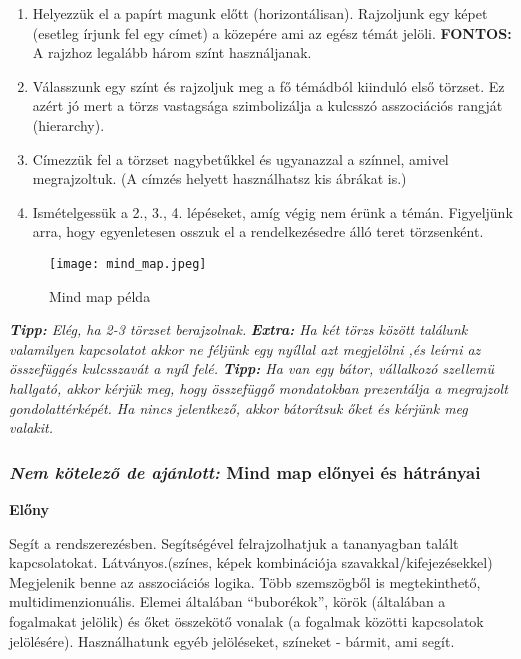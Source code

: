 \documentclass[../Main.tex]{subfiles}
\begin{document}
\begin{enumerate}
    \item Helyezzük el a papírt magunk előtt (horizontálisan).
    Rajzoljunk egy képet (esetleg írjunk fel egy címet) a közepére ami az egész témát jelöli.
    \textbf{FONTOS:} A rajzhoz legalább három színt használjanak.
    
    
    \item Válasszunk egy színt és rajzoljuk meg a fő témádból kiinduló első törzset.
    Ez azért jó mert a törzs vastagsága szimbolizálja a kulcsszó asszociációs rangját (hierarchy).
    
    \item Címezzük fel a törzset nagybetűkkel és ugyanazzal a színnel, amivel megrajzoltuk.
    (A címzés helyett használhatsz kis ábrákat is.)
    
    \item Ismételgessük a 2., 3., 4. lépéseket, amíg végig nem érünk a témán. Figyeljünk arra, hogy egyenletesen osszuk el a rendelkezésedre álló teret törzsenként.
    
\end{enumerate}
\begin{wrapfigure}{r}{0.5\textwidth}
    \centering
    \texttt{[image: mind\_map.jpeg]}
    \caption{Mind map példa}
    \end{wrapfigure}

\textit{\textbf{Tipp:} Elég, ha 2-3 törzset berajzolnak.} \newline
\textit{\textbf{Extra:} Ha két törzs között találunk valamilyen kapcsolatot akkor ne
féljünk egy nyíllal azt megjelölni ,és leírni az összefüggés kulcsszavát a nyíl felé.} \newline
\textit{\textbf{Tipp:} Ha van egy bátor, vállalkozó szellemü hallgató, akkor kérjük meg,
hogy összefüggő mondatokban prezentálja a megrajzolt gondolattérképét. Ha nincs jelentkező,
akkor bátorítsuk őket és kérjünk meg valakit.}

\subsubsection{\textit{Nem kötelező de ajánlott:} Mind map előnyei és hátrányai}

\textbf{Előny}

Segít a rendszerezésben.
Segítségével felrajzolhatjuk a tananyagban talált kapcsolatokat.
Látványos.(színes, képek kombinációja szavakkal/kifejezésekkel)
Megjelenik benne az asszociációs logika.
Több szemszögből is megtekinthető, multidimenzionuális.
Elemei általában “buborékok”, körök (általában a fogalmakat jelölik) és őket összekötő vonalak 
(a fogalmak közötti kapcsolatok jelölésére).
Használhatunk egyéb jelöléseket, színeket - bármit, ami segít.
\end{document}
